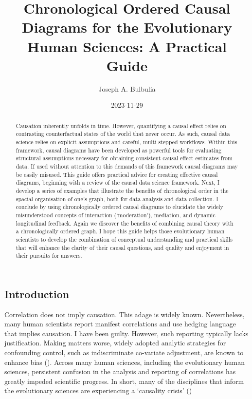 \documentclass[
  singlecolumn,
  9pt]{article}
\title{Chronological Ordered Causal Diagrams for the Evolutionary Human
Sciences: A Practical Guide}
\author{Joseph A. Bulbulia}
\affil{%
                  Victoria University of Wellington, New Zealand, School
                  of Psychology, Centre for Applied Cross-Cultural
                  Research
              }
\date{2023-11-29}
\begin{document}
\maketitle
\begin{abstract}
Causation inherently unfolds in time. However, quantifying a causal
effect relies on contrasting counterfactual states of the world that
never occur. As such, causal data science relies on explicit assumptions
and careful, multi-stepped workflows. Within this framework, causal
diagrams have been developed as powerful tools for evaluating structural
assumptions necessary for obtaining consistent causal effect estimates
from data. If used without attention to this demands of this framework
causal diagrams may be easily misused. This guide offers practical
advice for creating effective causal diagrams, beginning with a review
of the causal data science framework. Next, I develop a series of
examples that illustrate the benefits of chronological order in the
spacial organisation of one's graph, both for data analysis and data
collection. I conclude by using chronologically ordered causal diagrams
to elucidate the widely misunderstood concepts of interaction
(`moderation'), mediation, and dynamic longitudinal feedback. Again we
discover the benefits of combining causal theory with a chronologically
ordered graph. I hope this guide helps those evolutionary human
scientists to develop the combination of conceptual understanding and
practical skills that will enhance the clarity of their causal
questions, and quality and enjoyment in their pursuits for answers.
\end{abstract}
\subsection{Introduction}\label{introduction}

Correlation does not imply causation. This adage is widely known.
Nevertheless, many human scientists report manifest correlations and use
hedging language that implies causation. I have been guilty. However,
such reporting typically lacks justification. Making matters worse,
widely adopted analytic strategies for confounding control, such as
indiscriminate co-variate adjustment, are known to enhance bias
(). Across many human
sciences, including the evolutionary human sciences, persistent
confusion in the analysis and reporting of correlations has greatly
impeded scientific progress. In short, many of the disciplines that
inform the evolutionary sciences are experiencing a `causality crisis'
()
\end{document}
